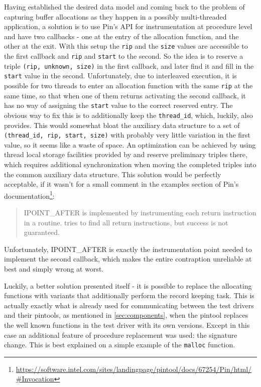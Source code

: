 Having established the desired data model and coming back to the problem of capturing buffer allocations as they
happen in a possibly multi-threaded application, a solution is to use {\small Pin's} API for instrumentation
at procedure level and have two callbacks - one at the entry of the allocation function, and the other at the
exit. With this setup the \texttt{rip} and the \texttt{size} values are accessible to the first callback and
\texttt{rip} and \texttt{start} to the second. So the idea is to reserve a triple \texttt{(rip, unknown, size)}
in the first callback, and later find it and fill in the \texttt{start} value in the second. Unfortunately, due
to interleaved execution, it is possible for two threads to enter an allocation function with the same
\texttt{rip} at the same time, so that when one of them returns activating the second callback, it has no way
of assigning the \texttt{start} value to the correct reserved entry. The obvious way to fix this is to
additionally keep the \texttt{thread\_id}, which, luckily, \pin also provides. This would somewhat bloat the
auxiliary data structure to a set of \texttt{(thread\_id, rip, start, size)} with probably very little
variation in the first value, so it seems like a waste of space. An optimization can be achieved by using
thread local storage facilities provided by \pin and reserve preliminary triples there, which requires
additional synchronization when moving the completed triples into the common auxiliary data structure. This
solution would be perfectly acceptable, if it wasn't for a small comment in the examples section of {\small
Pin's}
documentation\footnote{\url{https://software.intel.com/sites/landingpage/pintool/docs/67254/Pin/html/\#Invocation}}:
\begin{quote}
{\small IPOINT\_AFTER} is implemented by instrumenting each return instruction in a routine. \pin tries to find
all return instructions, but success is not guaranteed.
\end{quote}
Unfortunately, {\small IPOINT\_AFTER} is exactly the instrumentation point needed to implement the second
callback, which makes the entire contraption unreliable at best and simply wrong at worst.

Luckily, a better solution presented itself - it is possible to replace the allocating functions with variants
that additionally perform the record keeping task.
This is actually exactly what is already used for communicating between the test drivers and their pintools, as
mentioned in \cref{sec:components}, when the pintool replaces the well known functions in the test driver with
its own versions. Except in this case an additional feature of procedure replacement was used: the signature
change. This is best explained on a simple example of the \texttt{malloc} function. 

